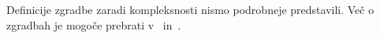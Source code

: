 \documentclass[fin1, tisk]{fmfdelo}
\begin{document}
\begin{opomba}
    Definicije zgradbe zaradi kompleksnosti nismo podrobneje predstavili. Več o zgradbah je mogoče prebrati 
    v~\cite{everitt2013veryshortintroductionbuildings} in~\cite{van2012generalized}.
\end{opomba}







\end{document}
